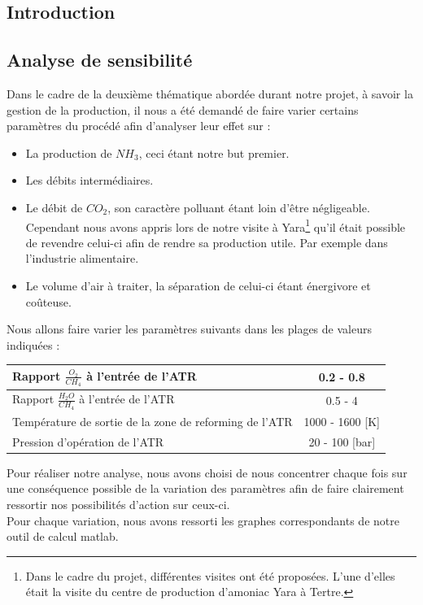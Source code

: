\documentclass[12pt]{report}
\begin{document}
\renewcommand{\arraystretch}{1.5}

{\textcolor{carmine}{\chapter{Introduction}}}


{\textcolor{carmine}{\chapter{Analyse de sensibilité}}}

Dans le cadre de la deuxième thématique abordée durant notre projet, à savoir la gestion de la production, il nous a été demandé de faire varier certains paramètres du procédé afin d'analyser leur effet sur : \\
\begin{itemize}
\item La production de $NH_3$, ceci étant notre but premier.
\item Les débits intermédiaires.
\item Le débit de $CO_2$, son caractère polluant étant loin d'être négligeable. Cependant nous avons appris lors de notre visite à Yara\footnote{Dans le cadre du projet, différentes visites ont été proposées. L'une d'elles était la visite du centre de production d'amoniac Yara à Tertre.} qu'il était possible de revendre celui-ci afin de rendre sa production utile. Par exemple dans l'industrie alimentaire. 
\item Le volume d'air à traiter, la séparation de celui-ci étant énergivore et coûteuse.
\end{itemize}

Nous allons faire varier les paramètres suivants dans les plages de valeurs indiquées : \\


\begin{tabular}{|l|c|}
\hline
Rapport $\frac{O_2}{CH_4}$ à l'entrée de l'ATR & 0.2 - 0.8 \\
\hline
Rapport $\frac{H_2O}{CH_4}$ à l'entrée de l'ATR & 0.5 - 4 \\
\hline
Température de sortie de la zone de reforming de l'ATR & 1000 - 1600 [K]\\
\hline
Pression d'opération de l'ATR & 20 - 100 [bar] \\
\hline
\end{tabular}
\bigskip

Pour réaliser notre analyse, nous avons choisi de nous concentrer chaque fois sur une conséquence possible de la variation des paramètres afin de faire clairement ressortir nos possibilités d'action sur ceux-ci.\\
Pour chaque variation, nous avons ressorti les graphes correspondants de notre outil de calcul matlab.\\
\end{document}
